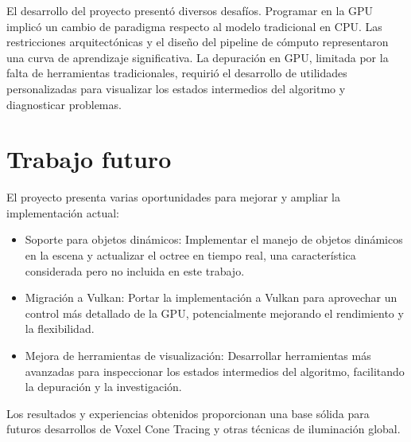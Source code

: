 El desarrollo del proyecto presentó diversos desafíos.
Programar en la GPU implicó un cambio de paradigma respecto al modelo tradicional en CPU.
Las restricciones arquitectónicas y el diseño del pipeline de cómputo representaron una curva de aprendizaje significativa.
La depuración en GPU, limitada por la falta de herramientas tradicionales, requirió el desarrollo de utilidades personalizadas para visualizar los estados intermedios del algoritmo y diagnosticar problemas.

\section{Trabajo futuro}

El proyecto presenta varias oportunidades para mejorar y ampliar la implementación actual:

\begin{itemize}
    \item Soporte para objetos dinámicos: Implementar el manejo de objetos dinámicos en la escena y actualizar el octree en tiempo real, una característica considerada pero no incluida en este trabajo.
    \item Migración a Vulkan: Portar la implementación a Vulkan para aprovechar un control más detallado de la GPU, potencialmente mejorando el rendimiento y la flexibilidad.
    \item Mejora de herramientas de visualización: Desarrollar herramientas más avanzadas para inspeccionar los estados intermedios del algoritmo, facilitando la depuración y la investigación.
\end{itemize}

Los resultados y experiencias obtenidos proporcionan una base sólida para futuros desarrollos de Voxel Cone Tracing y otras técnicas de iluminación global.
